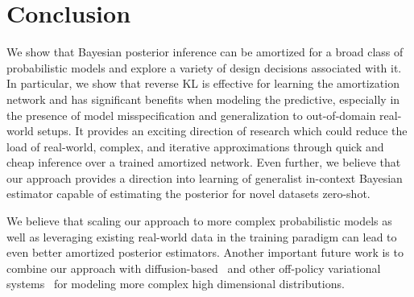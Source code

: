 \vspace{-2mm}
\section{Conclusion}
\vspace{-1mm}
We show that Bayesian posterior inference can be amortized for a broad class of probabilistic models and explore a variety of design decisions associated with it. In particular, we show that reverse KL is effective for learning the amortization network and has significant benefits when modeling the predictive, especially in the presence of model misspecification and generalization to out-of-domain real-world setups. It provides an exciting direction of research which could reduce the load of real-world, complex, and iterative approximations through quick and cheap inference over a trained amortized network. Even further, we believe that our approach provides a direction into learning of generalist in-context Bayesian estimator capable of estimating the posterior for novel datasets zero-shot. 

We believe that scaling our approach to more complex probabilistic models as well as leveraging existing real-world data in the training paradigm can lead to even better amortized posterior estimators. Another important future work is to combine our approach with diffusion-based~\citep{zhang2021path,vargas2023denoising} and other off-policy variational systems~\citep{bengio2021flow} for modeling more complex high dimensional distributions.